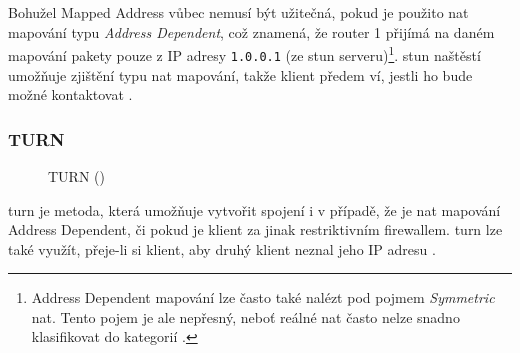 Bohužel Mapped Address vůbec nemusí být užitečná, pokud je použito \gls{nat}
mapování typu \textit{Address Dependent}, což znamená, že router 1 přijímá na
daném mapování pakety pouze z IP adresy \texttt{1.0.0.1} (ze
\gls{stun} serveru)\footnote{Address Dependent mapování lze často také nalézt
    pod pojmem \textit{Symmetric} \gls{nat}. Tento pojem je ale nepřesný, neboť
    reálné \gls{nat} často nelze snadno klasifikovat do kategorií
    \parencite{IETF-RFC4787}.}. \gls{stun} naštěstí umožňuje zjištění typu \gls{nat}
mapování, takže klient předem ví, jestli ho bude možné kontaktovat
\parencite{WebRTCForTheCurious}.

\subsubsection{TURN}\label{turn}

\begin{figure}[H]
    \centering
    \caption{TURN (\publicPrivateIP)}
    \label{turnFig}
\end{figure}

\gls{turn} je metoda, která umožňuje vytvořit spojení i v případě, že je
\gls{nat} mapování Address Dependent, či pokud je klient za jinak restriktivním
firewallem. \gls{turn} lze také využít, přeje-li si klient, aby druhý klient
neznal jeho IP adresu \parencite{WebRTCForTheCurious}.

